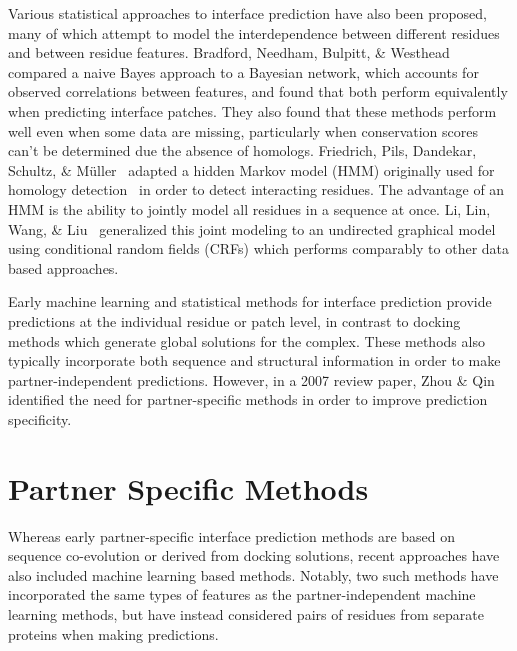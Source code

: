 Various statistical approaches to interface prediction have also been proposed, many of which attempt to model the interdependence between different residues and between residue features.
Bradford, Needham, Bulpitt, \& Westhead~\cite{bradford2006} compared a naive Bayes approach to a Bayesian network, which accounts for observed correlations between features, and found that both perform equivalently when predicting interface patches.
They also found that these methods perform well even when some data are missing, particularly when conservation scores can't be determined due the absence of homologs.
Friedrich, Pils, Dandekar, Schultz, \& M{\"u}ller~\cite{friedrich2006} adapted a hidden Markov model (HMM) originally used for homology detection~\cite{eddy1998} in order to detect interacting residues.
The advantage of an HMM is the ability to jointly model all residues in a sequence at once.
Li, Lin, Wang, \& Liu~\cite{li2007} generalized this joint modeling to an undirected graphical model using conditional random fields (CRFs) which performs comparably to other data based approaches.

Early machine learning and statistical methods for interface prediction provide predictions at the individual residue or patch level, in contrast to docking methods which generate global solutions for the complex.
These methods also typically incorporate both sequence and structural information in order to make partner-independent predictions.
However, in a 2007 review paper, Zhou \& Qin\cite{zhou2007} identified the need for partner-specific methods in order to improve prediction specificity.


\section{Partner Specific Methods}

Whereas early partner-specific interface prediction methods are based on sequence co-evolution or derived from docking solutions, recent approaches have also included machine learning based methods.
Notably, two such methods have incorporated the same types of features as the partner-independent machine learning methods, but have instead considered pairs of residues from separate proteins when making predictions. 

